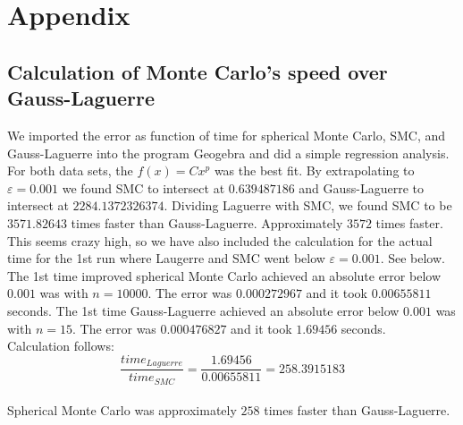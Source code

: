 \documentclass{article}
\begin{document}
\section{Appendix} \label{sec:Appendix}

\subsection{Calculation of Monte Carlo's speed over Gauss-Laguerre} \label{MC>GQ}

We imported the error as function of time for spherical Monte Carlo, SMC, and Gauss-Laguerre into the program Geogebra and did a simple regression analysis. For both data sets, the $f(x) = C x^p$ was the best fit. By extrapolating to $ \varepsilon = 0.001$ we found SMC to intersect at $0.639487186$ and Gauss-Laguerre to intersect at $2284.1372326374$. Dividing Laguerre with SMC, we found SMC to be $3571.82643$ times faster than Gauss-Laguerre. Approximately $3572$ times faster. This seems crazy high, so we have also included the calculation for the actual time for the 1st run where Laugerre and SMC went below $\varepsilon = 0.001$. See below. \\

The 1st time improved spherical Monte Carlo achieved an absolute error below $0.001$ was with $n=10000$. The error was $0.000272967$ and it took $0.00655811$ seconds. The 1st time Gauss-Laguerre achieved an absolute error below $0.001$ was with $n=15$. The error was $0.000476827$ and it took $1.69456$ seconds. \\

Calculation follows: \\

$$\frac{time_{Laguerre}}{time_{SMC}} = \frac{1.69456}{0.00655811} = 258.3915183$$ \\

Spherical Monte Carlo was approximately $258$ times faster than Gauss-Laguerre.\\
\end{document}
